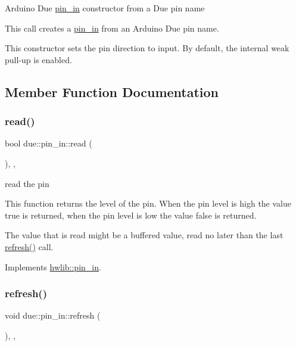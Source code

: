 Arduino Due \hyperlink{classdue_1_1pin__in}{pin\+\_\+in} constructor from a Due pin name

This call creates a \hyperlink{classdue_1_1pin__in}{pin\+\_\+in} from an Arduino Due pin name.

This constructor sets the pin direction to input. By default, the internal weak pull-\/up is enabled. 

\subsection{Member Function Documentation}
\mbox{\label{classdue_1_1pin__in_aa032c49b961b38e4afaeb4a811311449}} 
\subsubsection{\texorpdfstring{read()}{read()}}
{\footnotesize\ttfamily bool due\+::pin\+\_\+in\+::read (\begin{DoxyParamCaption}{ }\end{DoxyParamCaption})\hspace{0.3cm}{\ttfamily [inline]}, {\ttfamily [override]}, {\ttfamily [virtual]}}





read the pin

This function returns the level of the pin. When the pin level is high the value true is returned, when the pin level is low the value false is returned.

The value that is read might be a buffered value, read no later than the last \hyperlink{classdue_1_1pin__in_aa83ead7fe5283fc95bae295ed1a35bd3}{refresh()} call. 

Implements \hyperlink{classhwlib_1_1pin__in_ad071bd2e17bb4af51390f6cbb728a194}{hwlib\+::pin\+\_\+in}.

\mbox{\label{classdue_1_1pin__in_aa83ead7fe5283fc95bae295ed1a35bd3}} 
\subsubsection{\texorpdfstring{refresh()}{refresh()}}
{\footnotesize\ttfamily void due\+::pin\+\_\+in\+::refresh (\begin{DoxyParamCaption}{ }\end{DoxyParamCaption})\hspace{0.3cm}{\ttfamily [inline]}, {\ttfamily [override]}, {\ttfamily [virtual]}}





